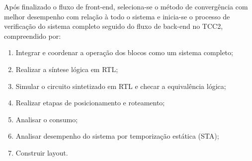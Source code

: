\documentclass[
	article,			%
	11pt,				%
	oneside,			%
	a4paper,			%
	twocolumn,
	english,			%
	brazil,				%
	sumario=tradicional
	]{abntex2}
\begin{document}
Após finalizado o fluxo de front-end, seleciona-se o método de convergência com melhor desempenho com relação à todo o sistema e inicia-se o processo de verificação do sistema completo seguido do fluxo de back-end no TCC2, compreendido por:

\begin{enumerate}
    \item Integrar e coordenar a operação dos blocos como um sistema completo;
    \item Realizar a síntese lógica em RTL;
    \item Simular o circuito sintetizado em RTL e checar a equivalência lógica;
    \item Realizar etapas de posicionamento e roteamento;
    \item Analisar o consumo;
    \item Analisar desempenho do sistema por temporização estática (STA);
    \item Construir layout.
\end{enumerate}


\postextual


\end{document}
